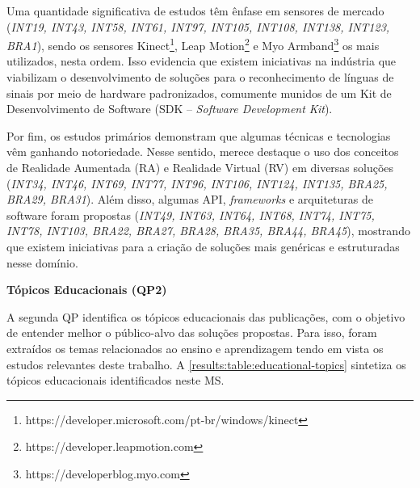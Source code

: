 Uma quantidade significativa de estudos têm ênfase em sensores de mercado (\textit{INT19, INT43, INT58, INT61, INT97, INT105, INT108, INT138, INT123, BRA1}), sendo os sensores Kinect\footnote{https://developer.microsoft.com/pt-br/windows/kinect}, Leap Motion\footnote{https://developer.leapmotion.com} e Myo Armband\footnote{https://developerblog.myo.com} os mais utilizados, nesta ordem. Isso evidencia que existem iniciativas na indústria que viabilizam o desenvolvimento de soluções para o reconhecimento de línguas de sinais por meio de hardware padronizados, comumente munidos de um Kit de Desenvolvimento de Software (SDK -- \textit{Software Development Kit}).

Por fim, os estudos primários demonstram que algumas técnicas e tecnologias vêm ganhando notoriedade. Nesse sentido, merece destaque o uso dos conceitos de Realidade Aumentada (RA) e Realidade Virtual (RV) em diversas soluções (\textit{INT34, INT46, INT69, INT77, INT96, INT106, INT124, INT135, BRA25, BRA29, BRA31}). Além disso, algumas API, \textit{frameworks} e arquiteturas de software foram propostas (\textit{INT49, INT63, INT64, INT68, INT74, INT75, INT78, INT103, BRA22, BRA27, BRA28, BRA35, BRA44, BRA45}), mostrando que existem iniciativas para a criação de soluções mais genéricas e estruturadas nesse domínio.

\noindent
\textbf{Tópicos Educacionais (QP2)}

A segunda QP identifica os tópicos educacionais das publicações, com o objetivo de entender melhor o público-alvo das soluções propostas. Para isso, foram extraídos os temas relacionados ao ensino e aprendizagem tendo em vista os estudos relevantes deste trabalho. A \autoref{results:table:educational-topics} sintetiza os tópicos educacionais identificados neste MS.

